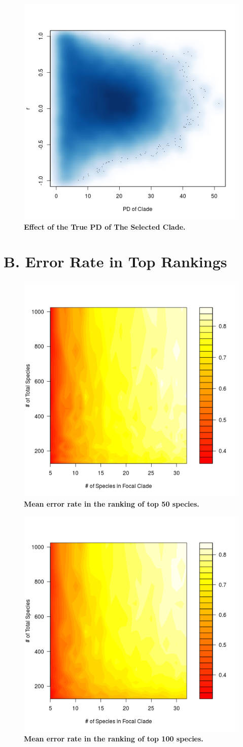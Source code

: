 \documentclass[12pt,english]{article}
\begin{document}
\begin{figure}[!ht]
  \center
  \includegraphics[width=.5\textwidth]{cladePD.png}
  \caption{\textbf{Effect of the True PD of The Selected Clade.}}
\end{figure}

\clearpage
\clearpage
\section*{B. Error Rate in Top Rankings}

\begin{figure}[!ht]
  \center
  \includegraphics[width=.5\textwidth]{errorRate50.png}
  \caption{\textbf{Mean error rate in the ranking of top 50 species.}}
\end{figure}

\begin{figure}[!ht]
  \center
  \includegraphics[width=.5\textwidth]{errorRate100.png}
  \caption{\textbf{Mean error rate in the ranking of top 100 species.} }
\end{figure}
\end{document}
